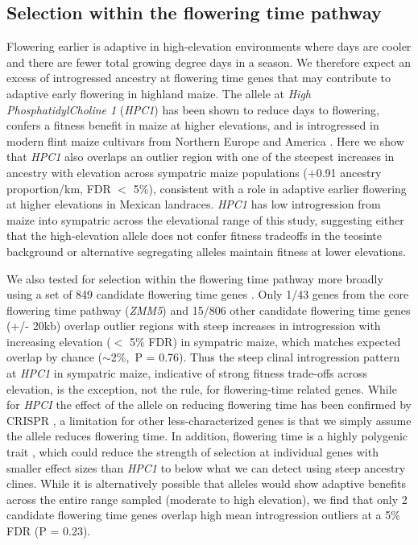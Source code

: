\subsection*{Selection within the flowering time pathway}

Flowering earlier is adaptive in high-elevation environments where days are cooler and there are fewer total growing degree days in a season.
We therefore expect an excess of introgressed \mexicana ancestry at flowering time genes that may contribute to adaptive early flowering in highland maize.
The \mexicana allele at \textit{High PhosphatidylCholine 1} (\textit{HPC1}) has been shown to reduce days to flowering, confers a fitness benefit in maize at higher elevations, and is introgressed in modern flint maize cultivars from Northern Europe and America \cite{Rodriguez-Zapata:2021}. 
Here we show that \textit{HPC1} also overlaps an outlier region with one of the steepest increases in \mexicana ancestry with elevation across sympatric maize populations (+0.91 \mexicana ancestry proportion/km, FDR $<$ 5\%), consistent with a role in adaptive earlier flowering at higher elevations in Mexican landraces. 
\textit{HPC1} has low introgression from maize into sympatric \mexicana across the elevational range of this study, suggesting either that the high-elevation \mexicana allele does not confer fitness tradeoffs in the teosinte background or alternative segregating \mexicana alleles maintain fitness at lower elevations.

We also tested for selection within the flowering time pathway more broadly using a set of 849 candidate flowering time genes \cite{Dong:2012_flowering, Li:2016_flowering}.
Only 1/43 genes from the core flowering time pathway (\textit{ZMM5}) \cite{Dong:2012_flowering} and 15/806 other candidate flowering time genes \cite{Li:2016_flowering} (+/- 20kb) overlap outlier regions with steep increases in \mexicana introgression  with increasing elevation ($<$ 5\% FDR) in sympatric maize, which matches expected overlap by chance ($\sim$2\%,\ P = 0.76).
Thus the steep clinal introgression pattern at \textit{HPC1} in sympatric maize, indicative of strong fitness trade-offs across elevation, is the exception, not the rule, for flowering-time related genes. While for \textit{HPCI} the effect of the \mexicana allele on reducing flowering time has been confirmed by CRISPR \cite{Rodriguez-Zapata:2021}, a limitation for other less-characterized genes is that we simply assume the \mexicana allele reduces flowering time. 
In addition, flowering time is a highly polygenic trait \cite{Buckler:2009}, which could reduce the strength of selection at individual genes with smaller effect sizes than \textit{HPC1} to below what we can detect using steep ancestry clines. 
While it is alternatively possible that \mexicana alleles would show adaptive benefits across the entire range sampled (moderate to high elevation), we find that only 2 candidate flowering time genes overlap high mean \mexicana introgression outliers at a 5\% FDR (P = 0.23).

